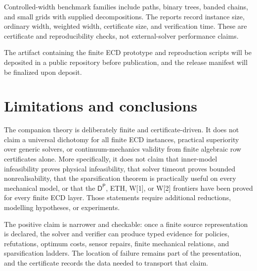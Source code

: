 \documentclass[11pt]{article}
\theoremstyle{plain}
\theoremstyle{definition}
\theoremstyle{remark}
\begin{document}
Controlled-width benchmark families include paths, binary trees,
banded chains, and small grids with supplied decompositions.  The reports record
instance size, ordinary width, weighted width, certificate size, and verification
time.  These are certificate and reproducibility checks, not external-solver
performance claims.

The artifact containing the finite ECD prototype and reproduction scripts will
be deposited in a public repository before publication, and the release
manifest will be finalized upon deposit.

\section{Limitations and conclusions}
\label{sec:limitations}

The companion theory is deliberately finite and certificate-driven.  It does not
claim a universal dichotomy for all finite ECD instances, practical superiority
over generic solvers, or continuum-mechanics validity from finite algebraic row
certificates alone.  More specifically, it does not claim that inner-model
infeasibility proves physical infeasibility, that solver timeout proves bounded
nonrealisability, that the sparsification theorem is practically useful on every
mechanical model, or that the \(\mathsf D^{\mathsf P}\), ETH, W[1], or W[2]
frontiers have been proved for every finite ECD layer.  Those statements require
additional reductions, modelling hypotheses, or experiments.

The positive claim is narrower and checkable: once a finite source
representation is declared, the solver and verifier can produce typed evidence
for policies, refutations, optimum costs, sensor repairs, finite mechanical
relations, and sparsification ladders.  The location of failure remains part of
the presentation, and the certificate records the data needed to transport that
claim.


\end{document}
